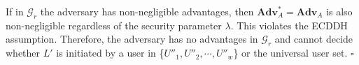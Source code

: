 If in $\mathcal{G}_r$ the adversary has non-negligible advantages,
    then $\mathbf{Adv}^*_{A}={\mathbf{Adv}}_{A}$ is also non-negligible regardless of the security parameter $\lambda$.
This violates the ECDDH assumption.
Therefore, the adversary has no advantages in $\mathcal{G}_r$ and cannot decide whether $L'$ is initiated by a user in \{${U''_1}, {U''_2}, \cdots, {U''_w}$\} or the universal user set.
\hfill $\square$

\oldc

